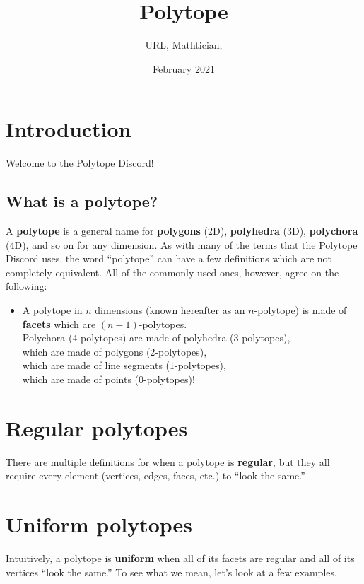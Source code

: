 \documentclass{article}
\title{Polytope}
\author{URL, Mathtician, }
\date{February 2021}
\begin{document}
\maketitle

\section{Introduction}
Welcome to the \href{https://discord.gg/invite/zMRu7T4}{Polytope Discord}!

\subsection{What is a polytope?}
A \textbf{polytope} is a general name for
\textbf{polygons} (2D), \textbf{polyhedra} (3D), \textbf{polychora} (4D),
and so on for any dimension.
As with many of the terms that the Polytope Discord uses,
the word ``polytope'' can have a few definitions which are not completely equivalent.
All of the commonly-used ones, however, agree on the following:
\begin{itemize}
\item
  A polytope in $n$ dimensions (known hereafter as an $n$-polytope)
  is made of \textbf{facets} which are $(n-1)$-polytopes.\\
  Polychora ($4$-polytopes) are made of polyhedra ($3$-polytopes),\\
  which are made of polygons ($2$-polytopes),\\
  which are made of line segments ($1$-polytopes),\\
  which are made of points ($0$-polytopes)!
\end{itemize}

\section{Regular polytopes}
There are multiple definitions for when a polytope is \textbf{regular},
but they all require every element (vertices, edges, faces, etc.) to ``look the same.''

\section{Uniform polytopes}
Intuitively, a polytope is \textbf{uniform}
when all of its facets are regular and all of its vertices ``look the same.''
To see what we mean, let's look at a few examples.
\end{document}
